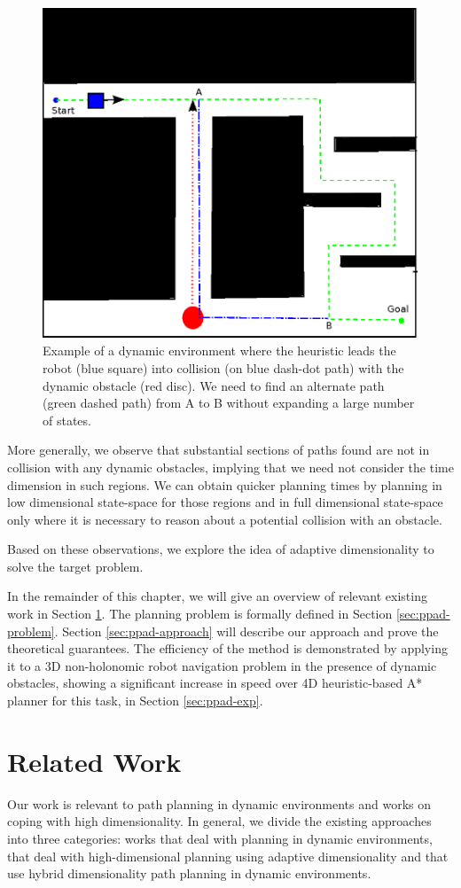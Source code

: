 \begin{figure}[tb!]
\centering%
\includegraphics[width=0.7\linewidth]{Figures/intro.eps}%
\caption{Example of a dynamic environment where the heuristic leads the robot (blue square) into collision (on blue dash-dot path) with the dynamic obstacle (red disc). We need to find an alternate path (green dashed path) from A to B without expanding a large number of states.}%
\label{fig:ppad-motivation}
\end{figure}

More generally, we observe that substantial sections of paths found are not in collision with any dynamic obstacles, implying that we need not consider the time dimension in such regions. We can obtain quicker planning times by planning in low dimensional state-space for those regions and in full dimensional state-space only where it is necessary to reason about a potential collision with an obstacle. 

Based on these observations, we explore the idea of adaptive dimensionality to solve the target problem.

In the remainder of this chapter, we will give an overview of relevant existing work in Section \ref{sec:ppad-related-work}. 
The planning problem is formally defined in Section \ref{sec:ppad-problem}.
Section \ref{sec:ppad-approach} will describe our approach and prove the theoretical guarantees. The efficiency of the method is demonstrated by applying it to a 3D non-holonomic robot navigation problem in the presence of dynamic obstacles, showing a significant increase in speed over 4D heuristic-based A* planner for this task, in Section \ref{sec:ppad-exp}.

\section{Related Work}
\label{sec:ppad-related-work}
Our work is relevant to path planning in dynamic environments and works on coping with high dimensionality. In general, we divide the existing approaches into three categories: works that deal with planning in dynamic environments, that deal with high-dimensional planning using adaptive dimensionality and that use hybrid dimensionality path planning in dynamic environments.

